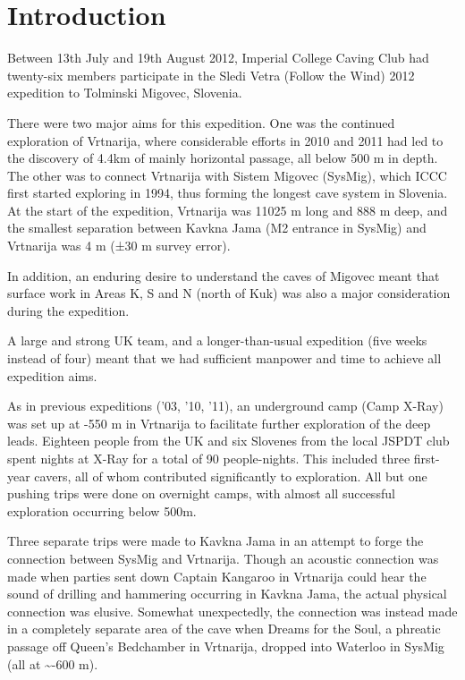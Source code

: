 \hypertarget{introduction-2}{%
\section{Introduction}\label{introduction-2}}

Between 13th July and 19th August 2012, Imperial College Caving Club had
twenty-six members participate in the Sledi Vetra (Follow the Wind) 2012
expedition to Tolminski Migovec, Slovenia.

There were two major aims for this expedition. One was the continued
exploration of Vrtnarija, where considerable efforts in 2010 and 2011
had led to the discovery of 4.4km of mainly horizontal passage, all
below 500 m in depth. The other was to connect Vrtnarija with Sistem
Migovec (SysMig), which ICCC first started exploring in 1994, thus
forming the longest cave system in Slovenia. At the start of the
expedition, Vrtnarija was 11025 m long and 888 m deep, and the smallest
separation between Kavkna Jama (M2 entrance in SysMig) and Vrtnarija was
4 m (±30 m survey error).

In addition, an enduring desire to understand the caves of Migovec meant
that surface work in Areas K, S and N (north of Kuk) was also a major
consideration during the expedition.

A large and strong UK team, and a longer-than-usual expedition (five
weeks instead of four) meant that we had sufficient manpower and time to
achieve all expedition aims.

As in previous expeditions ('03, '10, '11), an underground camp (Camp
X-Ray) was set up at -550 m in Vrtnarija to facilitate further
exploration of the deep leads. Eighteen people from the UK and six
Slovenes from the local JSPDT club spent nights at X-Ray for a total of
90 people-nights. This included three first-year cavers, all of whom
contributed significantly to exploration. All but one pushing trips were
done on overnight camps, with almost all successful exploration
occurring below 500m.

Three separate trips were made to Kavkna Jama in an attempt to forge the
connection between SysMig and Vrtnarija. Though an acoustic connection
was made when parties sent down Captain Kangaroo in Vrtnarija could hear
the sound of drilling and hammering occurring in Kavkna Jama, the actual
physical connection was elusive. Somewhat unexpectedly, the connection
was instead made in a completely separate area of the cave when Dreams
for the Soul, a phreatic passage off Queen's Bedchamber in Vrtnarija,
dropped into Waterloo in SysMig (all at \textasciitilde{}-600 m).

